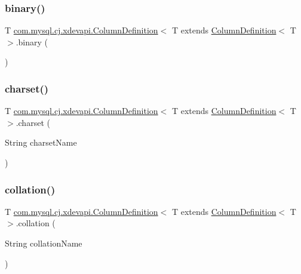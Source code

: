 \subsubsection{\texorpdfstring{binary()}{binary()}}
{\footnotesize\ttfamily T \mbox{\hyperlink{interfacecom_1_1mysql_1_1cj_1_1protocol_1_1_column_definition}{com.\+mysql.\+cj.\+xdevapi.\+Column\+Definition}}$<$ T extends \mbox{\hyperlink{interfacecom_1_1mysql_1_1cj_1_1protocol_1_1_column_definition}{Column\+Definition}}$<$ T $>$.binary (\begin{DoxyParamCaption}{ }\end{DoxyParamCaption})}

\mbox{\label{interfacecom_1_1mysql_1_1cj_1_1xdevapi_1_1_column_definition_ae287cbf6c79408b4626bf68c4bf6ea7b}} 
\subsubsection{\texorpdfstring{charset()}{charset()}}
{\footnotesize\ttfamily T \mbox{\hyperlink{interfacecom_1_1mysql_1_1cj_1_1protocol_1_1_column_definition}{com.\+mysql.\+cj.\+xdevapi.\+Column\+Definition}}$<$ T extends \mbox{\hyperlink{interfacecom_1_1mysql_1_1cj_1_1protocol_1_1_column_definition}{Column\+Definition}}$<$ T $>$.charset (\begin{DoxyParamCaption}\item[{String}]{charset\+Name }\end{DoxyParamCaption})}

\mbox{\label{interfacecom_1_1mysql_1_1cj_1_1xdevapi_1_1_column_definition_a9cb72f8fcdfe353f3d0576baf42254cc}} 
\subsubsection{\texorpdfstring{collation()}{collation()}}
{\footnotesize\ttfamily T \mbox{\hyperlink{interfacecom_1_1mysql_1_1cj_1_1protocol_1_1_column_definition}{com.\+mysql.\+cj.\+xdevapi.\+Column\+Definition}}$<$ T extends \mbox{\hyperlink{interfacecom_1_1mysql_1_1cj_1_1protocol_1_1_column_definition}{Column\+Definition}}$<$ T $>$.collation (\begin{DoxyParamCaption}\item[{String}]{collation\+Name }\end{DoxyParamCaption})}

